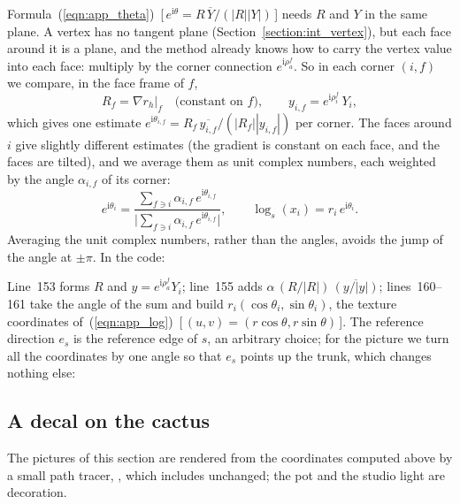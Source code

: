 Formula~(\ref{eqn:app_theta})~[\,$e^{\mathrm i\theta} = R\,\overline Y/(|R||Y|)$\,] needs $R$ and $Y$ in the same plane. A vertex has no tangent plane (Section~\ref{section:int_vertex}), but each face around it is a plane, and the method already knows how to carry the vertex value into each face: multiply by the corner connection $e^{\mathrm i\rho_a^f}$. So in each corner $(i, f)$ we compare, in the face frame of $f$,
\begin{equation*}
R_f = \nabla r_h|_f \quad\text{(constant on } f\text{)}, \qquad y_{i,f} = e^{\mathrm i\rho_i^f}\, Y_i ,
\end{equation*}
which gives one estimate $e^{\mathrm i\theta_{i,f}} = R_f\,\overline{y_{i,f}}/(|R_f||y_{i,f}|)$ per corner. The faces around $i$ give slightly different estimates (the gradient is constant on each face, and the faces are tilted), and we average them as unit complex numbers, each weighted by the angle $\alpha_{i,f}$ of its corner:
\begin{equation*}
e^{\mathrm i\theta_i} = \frac{\sum_{f\ni i} \alpha_{i,f}\, e^{\mathrm i\theta_{i,f}}}{\big|\sum_{f\ni i} \alpha_{i,f}\, e^{\mathrm i\theta_{i,f}}\big|}, \qquad \log_s(x_i) = r_i\, e^{\mathrm i\theta_i} .
\end{equation*}
Averaging the unit complex numbers, rather than the angles, avoids the jump of the angle at $\pm\pi$. In the code:

Line~153 forms $R$ and $y = e^{\mathrm i\rho_a^f} Y_i$; line~155 adds $\alpha\, (R/|R|)\,\overline{(y/|y|)}$; lines~160--161 take the angle of the sum and build $r_i(\cos\theta_i, \sin\theta_i)$, the texture coordinates of~(\ref{eqn:app_log})~[\,$(u, v) = (r\cos\theta, r\sin\theta)$\,]. The reference direction $e_s$ is the reference edge of $s$, an arbitrary choice; for the picture we turn all the coordinates by one angle so that $e_s$ points up the trunk, which changes nothing else:


\subsection{A decal on the cactus}

The pictures of this section are rendered from the coordinates computed above by a small path tracer, , which includes  unchanged; the pot and the studio light are decoration.

